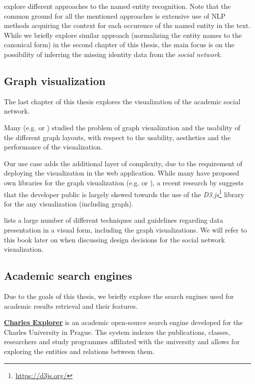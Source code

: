 \cite{ner-approaches} explore different approaches to the named entity recognition.
Note that the common ground for all the mentioned approaches is extensive use of \ac{NLP} methods acquiring the context for each occurence of the named entity in the text.
While we briefly explore similar approach (normalizing the entity names to the canonical form) in the second chapter of this thesis,
the main focus is on the possibility of inferring the missing identity data from the \textit{social network}. 

\subsection*{Graph visualization}

The last chapter of this thesis explores the visualization of the academic social network.

Many (e.g. \cite{aesthetics-graph} or \cite{cgv-graph}) studied the problem of graph visualization and the usability of the different graph layouts,
with respect to the usability, aesthetics and the performance of the visualization.

Our use case adds the additional layer of complexity, due to the requirement of deploying the visualization in the web application.
While many have proposed own libraries for the graph visualization (e.g. \cite{wigis} or \cite{franz2016cytoscape}),
a recent research by \cite{Greif_Burel_2024} suggests that the developer public is largely skewed towards the use of the \textit{D3.js}\footnote{\url{https://d3js.org/}}
library for the any visualization (including graph).

\cite{10.5555/2385879} lists a large number of different techniques and guidelines regarding 
data presentation in a visual form, including the graph visualizations.
We will refer to this book later on when discussing design decisions for the social network visualization.

\subsection*{Academic search engines}

Due to the goals of this thesis, we briefly explore the search engines used for academic results retrieval and their features.

\textbf{\href{https://explorer.cuni.cz}{Charles Explorer}} is an academic open-source search engine developed for the Charles University in Prague.
The system indexes the publications, classes, researchers and study programmes affiliated with the university and allows for exploring the entities and relations between them.

